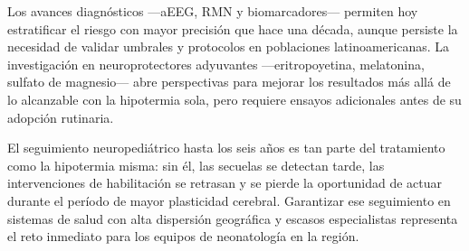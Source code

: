 \documentclass[12pt]{article}
\begin{document}
Los avances diagnósticos ---aEEG, RMN y biomarcadores--- permiten hoy estratificar el
riesgo con mayor precisión que hace una década, aunque persiste la necesidad de
validar umbrales y protocolos en poblaciones latinoamericanas. La investigación en
neuroprotectores adyuvantes ---eritropoyetina, melatonina, sulfato de magnesio--- abre
perspectivas para mejorar los resultados más allá de lo alcanzable con la hipotermia
sola, pero requiere ensayos adicionales antes de su adopción rutinaria.

El seguimiento neuropediátrico hasta los seis años es tan parte del tratamiento como
la hipotermia misma: sin él, las secuelas se detectan tarde, las intervenciones de
habilitación se retrasan y se pierde la oportunidad de actuar durante el período
de mayor plasticidad cerebral. Garantizar ese seguimiento en sistemas de salud con
alta dispersión geográfica y escasos especialistas representa el reto inmediato para
los equipos de neonatología en la región.

\clearpage
\small
\singlespacing
\printbibliography[title={Referencias}]
\end{document}
